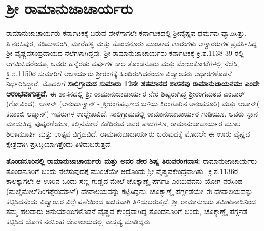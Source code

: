 \vskip -7pt


\section*{ಶ‍್ರೀ ರಾಮಾನುಜಾಚಾರ್ಯರು}

\vskip -2pt

ರಾಮಾನುಜಾಚಾರ್ಯರು ಕರ್ನಾಟಕಕ್ಕೆ ಬರುವ ವೇಳೆಗಾಗಲೇ ಕರ್ನಾಟಕದಲ್ಲಿ ಶ‍್ರೀವೈಷ್ಣವ ಧರ್ಮವು ವ್ಯಾಪಿಸಿತ್ತು. ತಿ.ನರಸಿಪುರ, ತಡಿಮಾಲಿಂಗಿ, ಮಾರೆಹಳ್ಳಿ ಮತ್ತು ತೊಂಡನೂರು ಮುಂತಾದ ಊರುಗಳು ಆಳ್ವಾರರುಗಳ ಪ್ರವರ್ತಿಸಿದ್ದ ಶ‍್ರೀ ವೈಷ್ಣವಸಂಪ್ರದಾಯದ ನೆಲೆಗಳಾಗಿದ್ದವು. ಶ‍್ರೀ ರಾಮಾನುಜಾಚಾರ್ಯರು ಕರ್ನಾಟಕಕ್ಕೆ ಕ್ರಿ.ಶ.1138-39 ರಲ್ಲಿ ಆಗಮಿಸಿದರೆಂದೂ, ಅವರು ಹನ್ನೆರಡು ವರ್ಷಗಳ ಕಾಲ ತೊಂಡನೂರು ಮತ್ತು ಮೇಲುಕೋಟೆಗಳಲ್ಲಿ ನೆಲೆಸಿ, ಕ್ರಿ.ಶ.1150ರ ಸುಮಾರಿಗೆ ಆಚಾರ್ಯರು ಶ‍್ರೀರಂಗಕ್ಕೆ ಹಿಂದಿರುಗಿದರೆಂದೂ ವಿದ್ವಾಂಸರು ಆಧಾರಗಳೊಡನೆ ನಿರ್ಧರಿಸಿದ್ದಾರೆ. ಮೊದಲಿಗೆ \textbf{ಸಾಲಿಗ್ರಾಮದ ಸುಮಾರು 12ನೇ ಶತಮಾನದ ಶಾಸನವು ರಾಮಾನುಜಾಯನಮಃ ಎಂದೇ ಆರಂಭವಾಗುತ್ತದೆ.} ಈ ಶಾಸನದಲ್ಲಿ ಶ‍್ರೀ ರಾಮಾನುಜಾಚಾರ್ಯರ ನೇರ ಶಿಷ್ಯರಾಗಿದ್ದ ಶ‍್ರೀರಂಗಮಠದ ಎಂಬಾರ್​(ಗೋವಿಂದ), ಆಳಾನ್​ (ಆನಂದಾಳ್ವಾನ್​ - ಶ‍್ರೀರಂಗಪಟ್ಟಣದ ಬಳಿಯ ಕಿರಂಗೂರಿನ ಅನಂತಸೂರಿ) ಮತ್ತು ಆಚಾನ್​( ಕಡಾಂಬಿ ಆಚ್ಚಾನ್​) ಇವರುಗಳ ಉಲ್ಲೇಖವಿದೆ. ಸಾಲಿಗ್ರಾಮದಲ್ಲಿ ರಾಮಾನುಜಾಚಾರ್ಯರ ಗುಡಿಯೂ, ಅವರು ಸ್ನಾನ ಮಾಡುತ್ತಿದ್ದ ಪುಷ್ಕರಣಿಯೂ, ಕಲ್ಲಿನಮೇಲೆ ಕಡೆದಿರುವ ಅವರ ಪಾದಗಳೂ, ರಾಮಾನುಜಾಚಾರ್ಯರ ಮೂಲ ಶಿಲಾಮೂರ್ತಿ ಮತ್ತು ಉತ್ಸವ ವಿಗ್ರಹವಿದೆ. ರಾಮಾನುಜಾಚಾರ್ಯರು ಬರುವುದಕ್ಕೆ ಮೊದಲೇ ಈ ಊರು ವೈಷ್ಣವ ಕ್ಷೇತ್ರವಾಗಿ ಪ್ರಸಿದ್ಧಿಯಾಗಿತ್ತೆಂದು ತಿಳಿದುಬರುತ್ತದೆ.

\textbf{ತೊಂಡನೂರಿನಲ್ಲಿ ರಾಮಾನುಜಾಚಾರ್ಯರು ಮತ್ತು ಅವರ ನೇರ ಶಿಷ್ಯ ತಿರುವರಂಗದಾಸ:} ರಾಮಾನುಜಾಚಾರ್ಯರು ತೊಂಡನೂರಿಗೆ ಬಂದು ನೆಲೆಸುವುದಕ್ಕೆ ಮುಂಚೆಯೇ ಅದೊಂದು ಶ‍್ರೀ ವೈಷ್ಣವಕೇಂದ್ರವಾಗಿತ್ತು. ಕ್ರಿ.ಶ.1136ರ ಕಾಲಕ್ಕಾಗಲೇ ಆ ಊರಿನ ಒಂದು ಸಣ್ಣ ಗುಡ್ಡದ ಮೇಲೆ ಚೊಕ್ಕಾಣ್ಡೈ ಪೆರ್ಗಡಿ ಎಂಬುವವನು ಯೋಗ ನರಸಿಂಹ (ಮಲೈಮೇಲ್​\break ಶಿಂಗಪ್ಪೆರುಮಾಳ್) ದೇವಾಲಯವನ್ನು ಕಟ್ಟಿಸಿದ್ದನು. ಚೊಕ್ಕಾಣ್ಡೈ ಪೆರ್ಗ್ಗಡೆಯೇ ಈ ದೇವಾಲಯವನ್ನು ಕಟ್ಟಿಸಿದನೆಂದು ವಿದ್ವಾಂಸರ ವಿಶ್ಲೇಷಣೆಯಿಂದ ಖಚಿತವಾಗಿ ತಿಳಿದುಬರುತ್ತದೆ. ಶ‍್ರೀ ರಾಮಾನುಜರು ತಮಿಳುನಾಡಿನಿಂದ ತಮ್ಮ ಹಲವಾರು ಅನುಯಾಯಿಗಳೊಡನೆ ವೈಷ್ಣವ ಕೇಂದ್ರವಾಗಿದ್ದ ತೊಂಡನೂರಿಗೆ ಬಂದು, ಚೊಕ್ಕಾಣ್ಡೈ ಪೆರ್ಗ್ಗಡೆ ಕಟ್ಟಿಸಿದ ಯೋಗ ನರಸಿಂಹ ದೇವಾಲಯದಲ್ಲಿ ವಾಸ್ತವ್ಯ ಮಾಡಿದ್ದರು.

